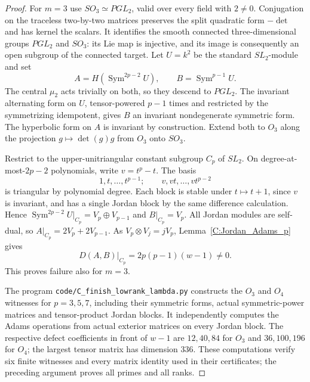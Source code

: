 \begin{proof}
For $m=3$ use $SO_3\simeq PGL_2$, valid over every field with $2\ne0$.
Conjugation on the traceless two-by-two matrices preserves the split
quadratic form $-\det$ and has kernel the scalars. It identifies the
smooth connected three-dimensional groups $PGL_2$ and $SO_3$: its
Lie map is injective, and its image is consequently an open subgroup
of the connected target. Let $U=k^2$ be the standard $SL_2$-module and set
\[
 A=H(\operatorname{Sym}^{2p-2}U),\qquad
 B=\operatorname{Sym}^{p-1}U.
\]
The central $\mu_2$ acts trivially on both, so they descend to $PGL_2$.
The invariant alternating form on $U$, tensor-powered $p-1$ times and
restricted by the symmetrizing idempotent, gives $B$ an invariant
nondegenerate symmetric form. The hyperbolic form on $A$ is invariant
by construction. Extend both to $O_3$ along the projection
$g\mapsto\det(g)g$ from $O_3$ onto $SO_3$.

Restrict to the upper-unitriangular constant subgroup $C_p$ of $SL_2$.
On degree-at-most-$2p-2$ polynomials, write $v=t^p-t$. The basis
\[
 1,t,\ldots,t^{p-1};\qquad v,vt,\ldots,vt^{p-2}
\]
is triangular by polynomial degree. Each block is stable under
$t\mapsto t+1$, since $v$ is invariant, and has a single Jordan block
by the same difference calculation. Hence
$\operatorname{Sym}^{2p-2}U|_{C_p}=V_p\oplus V_{p-1}$ and
$B|_{C_p}=V_p$. All Jordan modules are self-dual, so
$A|_{C_p}=2V_p+2V_{p-1}$. As $V_p\otimes V_j=jV_p$,
Lemma~\ref{C:Jordan_Adams_p} gives
\[
 D(A,B)\big|_{C_p}=2p(p-1)(w-1)\ne0.                 \tag{C.3.13}
\]
This proves failure also for $m=3$.

The program \texttt{code/C\_finish\_lowrank\_lambda.py} constructs the
$O_3$ and $O_4$ witnesses for $p=3,5,7$, including their symmetric
forms, actual symmetric-power matrices and tensor-product Jordan
blocks. It independently computes the Adams operations from actual
exterior matrices on every Jordan block. The respective defect
coefficients in front of $w-1$ are $12,40,84$ for $O_3$ and
$36,100,196$ for $O_4$; the largest tensor matrix has dimension $336$.
These computations verify six finite witnesses and every matrix identity
used in their certificates; the preceding argument proves all primes
and all ranks.
\end{proof}

